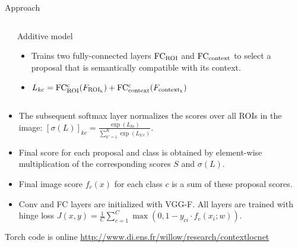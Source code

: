 \documentclass[final, xcolor={dvipsnames}]{beamer}
\def \postercolumnbreak {\vrule width 5pt height -2.5cm \hskip1cm}
\begin{document}
\begin{frame}[t,fragile]{}
\begin{mdframed}[style = posterframe]
\begin{columns}[t,onlytextwidth]
\begin{column}{.44\linewidth}
\begin{block}{Approach}
		\modelsep
		\begin{columns}[T,onlytextwidth]
			\begin{column}{\columnsizemodel}\end{column}
			\begin{column}{\columnsizedescr}
				\begin{block}{\small Additive model}
				\begin{itemize}
					\item Trains two fully-connected layers ${\rm FC_{ROI}}$ and ${\rm FC_{context}}$ to select a proposal that is semantically compatible with its context.
					\item $L_{kc} = {\rm FC_{ROI}^{c}}(F_{\rm ROI_k}) + {\rm FC_{context}^{c}}(F_{\rm context_k})$
				\end{itemize}
				\end{block}
			\end{column}
		\end{columns}
		\modelsep
		
		\begin{itemize}
			\increaseitemsep
			\item The subsequent softmax layer normalizes the scores over all ROIs in the image:  $ [ \sigma(L) ]_{kc} = \frac{\exp(L_{kc})}{\sum_{k'=1}^{K}{\exp(L_{k'c})}}$. 
			\item Final score for each proposal and class is obtained by element-wise multiplication of the corresponding scores $S$ and $\sigma(L)$.
			\item Final image score $f_c(x)$ for each class $c$ is a sum of these proposal scores.
			\item \colorbox{color_conv_fc}{Conv} and \colorbox{color_conv_fc}{FC} layers are initialized with VGG-F. All layers are trained with hinge loss $J(x, y) = \frac{1}{C}\sum_{c=1}^{C}\max(0, 1 - y_{ci} \cdot f_c(x_i; w))$.
		\end{itemize}
	
	\end{block}
	
	\begin{mdframed}[style = posteremphasize]
	\begin{block}{Torch code is online}
		\centering \url{http://www.di.ens.fr/willow/research/contextlocnet}
	\end{block}
	\end{mdframed}
\end{column}

\postercolumnbreak


\end{columns}
\end{mdframed}
\end{frame}
\end{document}
